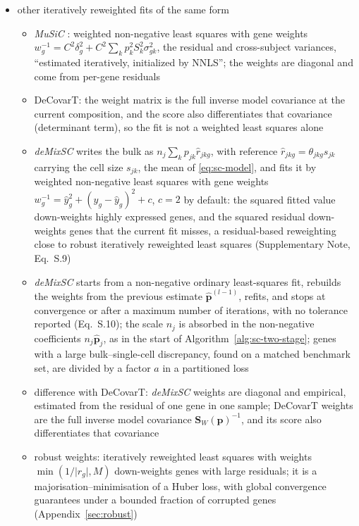 \begin{itemize}
\begin{itemize}
  \end{itemize}
  \item other iteratively reweighted fits of the same form
  \begin{itemize}
    \item \emph{MuSiC} \cite{wangBulkTissueCell2019}: weighted non-negative least squares with gene weights
          \(w_{g}^{-1}=C^{2}\delta_{g}^{2}+C^{2}\sum_{k}p_{k}^{2}S_{k}^{2}\sigma_{gk}^{2}\), the residual and cross-subject variances,
          ``estimated iteratively, initialized by NNLS''; the weights are diagonal and come from per-gene residuals
    \item DeCovarT: the weight matrix is the full inverse model covariance at the current composition, and the score
          also differentiates that covariance (determinant term), so the fit is not a weighted least squares alone
    \item \emph{deMixSC} \cite{guoDeMixSCDeconvolutionFramework2023} writes the bulk as \(n_{j}\sum_{k}p_{jk}\hat r_{jkg}\), with reference
          \(\hat r_{jkg}=\theta_{jkg}s_{jk}\) carrying the cell size \(s_{jk}\), the mean of \eqref{eq:sc-model}, and fits it by
          weighted non-negative least squares with gene weights
          \(w_{g}^{-1}=\hat y_{g}^{2}+(y_{g}-\hat y_{g})^{2}+c\), \(c=2\) by default: the squared fitted value down-weights highly
          expressed genes, and the squared residual down-weights genes that the current fit misses, a residual-based
          reweighting close to robust iteratively reweighted least squares (Supplementary Note, Eq.~S.9)
    \item \emph{deMixSC} starts from a non-negative ordinary least-squares fit, rebuilds the weights from the previous
          estimate \(\hat{\boldsymbol{p}}^{(l-1)}\), refits, and stops at convergence or after a maximum number of iterations, with no
          tolerance reported (Eq.~S.10); the scale \(n_{j}\) is absorbed in the non-negative coefficients
          \(n_{j}\hat{\boldsymbol{p}}_{j}\), as in the start of Algorithm~\ref{alg:sc-two-stage}; genes with a large bulk--single-cell
          discrepancy, found on a matched benchmark set, are divided by a factor \(a\) in a partitioned loss
    \item difference with DeCovarT: \emph{deMixSC} weights are diagonal and empirical, estimated from the residual of
          one gene in one sample; DeCovarT weights are the full inverse model covariance \(\boldsymbol{S}_{W}(\boldsymbol{p})^{-1}\), and its
          score also differentiates that covariance
    \item robust weights: iteratively reweighted least squares with weights \(\min(1/\lvert r_{g}\rvert,M)\) down-weights genes
          with large residuals; it is a majorisation--minimisation of a Huber loss, with global convergence guarantees under
          a bounded fraction of corrupted genes (Appendix~\ref{sec:robust})
  \end{itemize}
\end{itemize}

